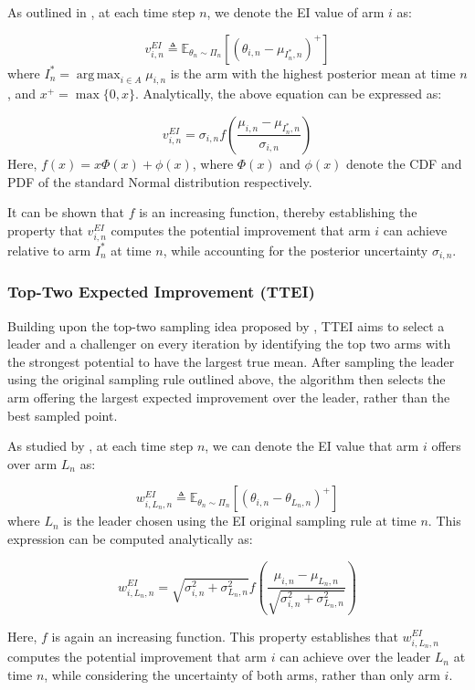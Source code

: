 \documentclass[a4paper, 12pt]{article}
\DeclareMathOperator{\argmax}{arg\,max}
\theoremstyle{definition}
\begin{document}
As outlined in \cite{ttei}, at each time step $n$, we denote the EI value of arm $i$ as:

\[
v_{i,n}^{EI} \triangleq \mathbb{E}_{\theta_n\sim \Pi_n} [(\theta_{i,n}-\mu_{I_n^*,n})^+]
\]
where $I_n^* = \argmax_{i\in A}\mu_{i,n}$ is the arm with the highest posterior mean at time $n$, and $x^+ = \max\{0,x\}$. Analytically, the above equation can be expressed as:

\[
v_{i,n}^{EI} = \sigma_{i,n} f\left(\frac{\mu_{i,n}-\mu_{I_n^*,n}}{\sigma_{i,n}}\right)
\]
Here, $f(x) = x \Phi(x) + \phi(x)$, where $\Phi(x)$ and $\phi(x)$ denote the CDF and PDF of the standard Normal distribution respectively. 

It can be shown that $f$ is an increasing function, thereby establishing the property that $v_{i,n}^{EI}$ computes the potential improvement that arm $i$ can achieve relative to arm $I_n^*$ at time $n$, while accounting for the posterior uncertainty $\sigma_{i,n}$.

\subsubsection{Top-Two Expected Improvement (TTEI)}
Building upon the top-two sampling idea proposed by \cite{toptwo}, TTEI aims to select a leader and a challenger on every iteration by identifying the top two arms with the strongest potential to have the largest true mean. After sampling the leader using the original sampling rule outlined above, the algorithm then selects the arm offering the largest expected improvement over the leader, rather than the best sampled point.

As studied by \cite{ttei}, at each time step $n$, we can denote the EI value that arm $i$ offers over arm $L_n$ as:

\[
w_{i,L_n,n}^{EI} \triangleq \mathbb{E}_{\theta_n\sim \Pi_n} [(\theta_{i,n}-\theta_{L_n,n})^+]
\]
where $L_n$ is the leader chosen using the EI original sampling rule at time $n$. This expression can be computed analytically as:

\[
w_{i,L_n,n}^{EI} = \sqrt{\sigma_{i,n}^2 + \sigma_{L_n,n}^2} f\left( \frac{\mu_{i,n}-\mu_{L_n,n}}{\sqrt{\sigma_{i,n}^2 + \sigma_{L_n,n}^2}}\right)
\]

Here, $f$ is again an increasing function. This property establishes that $w_{i,L_n,n}^{EI}$ computes the potential improvement that arm $i$ can achieve over the leader $L_n$ at time $n$, while considering the uncertainty of both arms, rather than only arm $i$.
\end{document}
